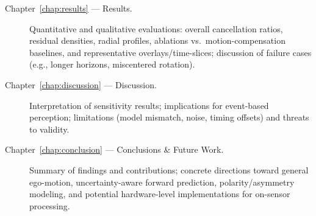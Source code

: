 \begin{description}
    \item[Chapter~\ref{chap:results} --- Results.] Quantitative and qualitative evaluations: overall cancellation ratios, residual densities, radial profiles, ablations vs.\ motion-compensation baselines, and representative overlays/time-slices; discussion of failure cases (e.g., longer horizons, miscentered rotation).
    \item[Chapter~\ref{chap:discussion} --- Discussion.] Interpretation of sensitivity results; implications for event-based perception; limitations (model mismatch, noise, timing offsets) and threats to validity.
    \item[Chapter~\ref{chap:conclusion} --- Conclusions \& Future Work.] Summary of findings and contributions; concrete directions toward general ego-motion, uncertainty-aware forward prediction, polarity/asymmetry modeling, and potential hardware-level implementations for on-sensor processing.
\end{description}

